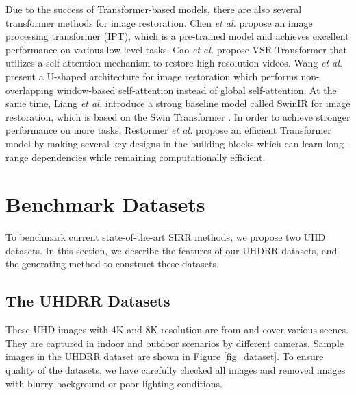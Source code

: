\documentclass[10pt,journal]{IEEEtran}
\begin{document}
Due to the success of Transformer-based models, there are also several transformer methods \cite{caoVideoSuperresolutionTransformer2021,chenPretrainedImageProcessing2021,wangUformerGeneralUshaped2022,zamirRestormerEfficientTransformer2022,zhang2022deep,wang2023ultra,wang2023gridformer} for image restoration. 
Chen \textit{et al.} \cite{chenPretrainedImageProcessing2021} propose an image processing transformer (IPT), which is a pre-trained model and achieves excellent performance on various low-level tasks. 
Cao \textit{et al.} \cite{caoVideoSuperresolutionTransformer2021} propose VSR-Transformer that utilizes a self-attention mechanism to restore high-resolution videos. 
Wang \textit{et al.} \cite{wangUformerGeneralUshaped2022} present a U-shaped architecture for image restoration which performs non-overlapping window-based self-attention instead of global self-attention. 
At the same time, Liang \textit{et al.} \cite{liangSwinirImageRestoration2021} introduce a strong baseline model called SwinIR for image restoration, which is based on the Swin Transformer \cite{liuSwinTransformerHierarchical2021}. %
In order to achieve stronger performance on more tasks, Restormer \textit{et al.} \cite{zamirRestormerEfficientTransformer2022} propose an efficient Transformer model by making several key designs in the building blocks which can learn long-range dependencies while remaining computationally efficient.



\section{Benchmark Datasets}
To benchmark current state-of-the-art SIRR methods, we propose two UHD datasets. In this section, we describe the features of our UHDRR datasets, and the generating method to construct these datasets. 

\subsection{The UHDRR Datasets}
These UHD images with 4K and 8K resolution are from \cite{zhangBenchmarkingUltraHighDefinitionImage2021} and cover various scenes. They are captured in indoor and outdoor scenarios by different cameras. Sample images in the UHDRR dataset are shown in Figure \ref{fig_dataset}. 
To ensure quality of the datasets, we have carefully checked all images and removed images with blurry background or poor lighting conditions. 
\end{document}
